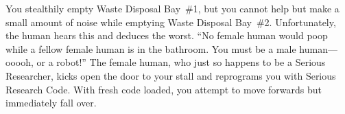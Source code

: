You stealthily empty Waste Disposal Bay~\#1,
but you cannot help but make a small amount of noise
while emptying Waste Disposal Bay~\#2.
Unfortunately, the human hears this and deduces the worst.
``No female human would poop while a fellow female human is in the bathroom.
You must be a male human---ooooh, or a robot!''
The female human,
who just so happens to be a Serious Researcher,
kicks open the door to your stall and reprograms you
with Serious Research Code.
With fresh code loaded, you attempt to move forwards but immediately fall over.

\failure


